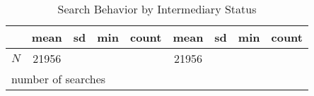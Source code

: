 \begin{table}[htbp]\centering
\def\sym#1{\ifmmode^{#1}\else\(^{#1}\)\fi}
\caption{Search Behavior by Intermediary Status}
\begin{tabular}{l*{2}{cccc}}
\hline\hline
            &        mean&          sd&         min&       count&        mean&          sd&         min&       count\\
\hline
\hline
\(N\)       &       21956&            &            &            &       21956&            &            &            \\
\hline\hline
\multicolumn{9}{l}{\footnotesize number of searches}\\
\end{tabular}
\end{table}

